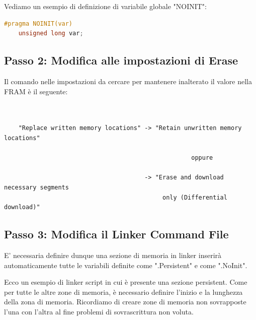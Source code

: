 \documentclass[LaM,binding=0.6cm]{../sapthesis}
\begin{document}
Vediamo un esempio di definizione di variabile globale "NOINIT":
\begin{lstlisting}[language=C]
    #pragma NOINIT(var)  
    unsigned long var;  
\end{lstlisting}

\subsection{Passo 2: Modifica alle impostazioni di Erase}
Il comando nelle impostazioni da cercare per mantenere inalterato il valore nella FRAM è il seguente:
\begin{verbatim}
    

    "Replace written memory locations" -> "Retain unwritten memory locations"
    
                                                    oppure
                                                    
                                       -> "Erase and download necessary segments 
                                            only (Differential download)"

\end{verbatim}
\subsection{Passo 3: Modifica il Linker Command File}
E' necessaria definire dunque una sezione di memoria in linker inserirà automaticamente tutte le variabili definite come ".Persistent" e come ".NoInit".

Ecco un esempio di linker script in cui è presente una sezione persistent.
Come per tutte le altre zone di memoria, è necessario definire l'inizio e la lunghezza della zona di memoria. Ricordiamo 
di creare zone di memoria non sovrapposte l'una con l'altra al fine problemi di sovrascrittura non voluta.
\end{document}
